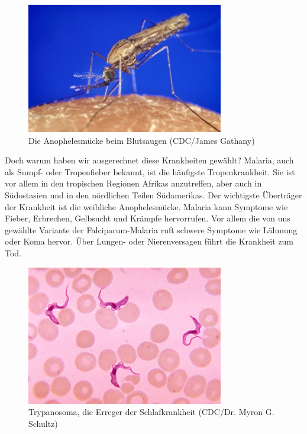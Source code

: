 \documentclass[10pt]{article}
\begin{document}
    \begin{figure}
        \includegraphics[width=\linewidth]{Anophelesmucke}
        \caption{Die Anophelesmücke beim Blutsaugen (CDC/James Gathany)}
    \end{figure}

    Doch warum haben wir ausgerechnet diese Krankheiten gewählt? Malaria, auch als Sumpf- oder Tropenfieber bekannt,
    ist die häufigste Tropenkrankheit. Sie ist vor allem in den tropischen Regionen Afrikas anzutreffen, aber auch in
    Südostasien und in den nördlichen Teilen Südamerikas. Der wichtigste Überträger der Krankheit ist die weibliche
    Anophelesmücke. Malaria kann Symptome wie Fieber, Erbrechen, Gelbsucht und Krämpfe hervorrufen. Vor allem die von
    uns gewählte Variante der Falciparum-Malaria ruft schwere Symptome wie Lähmung oder Koma hervor. Über Lungen-
    oder Nierenversagen führt die Krankheit zum Tod.

    \begin{figure}
        \includegraphics[width=\linewidth]{Trypanosoma}
        \caption{Trypanosoma, die Erreger der Schlafkrankheit (CDC/Dr. Myron G. Schultz)}
    \end{figure}
\end{document}
